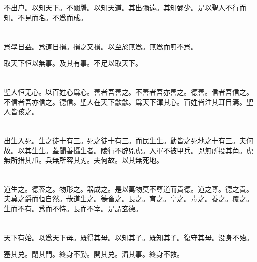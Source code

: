 \documentclass[a5paper]{ctexbook}
\newcommand{\bo}[1]{\textcolor[RGB]{0,255,255}{#1}}
\def\del{\sout}
\begin{document}
    \chapter{}

    不出户。\bo{以}知天下。不闚牖。\bo{以}知天道。其出彌遠。其知彌少。是以聖人不行而知。不見而名。不爲而成。

    \chapter{}

    爲學日益。爲道日損。損之又損。以至於無爲。無爲而無不爲。

    取天下\bo{恒}以無事。及其有事。不足以取天下。

    \chapter{}

    聖人\bo{恒无心}。以百姓心爲心。善者\bo{\del{吾}}善之。不善者\bo{\del{吾}}亦善之。德善。信者\bo{\del{吾}}信之。不信者\bo{\del{吾}}亦信之。德信。聖人在天下歙歙。爲天下渾其心。\bo{百姓皆注其耳目焉}。聖人皆孩之。

    \chapter{}

    出生入死。生之徒十有三。死之徒十有三。\bo{而民生生。動皆之死地之十有三}。夫何故。以其\bo{生生}。蓋聞善攝生者。\bo{陵}行不\bo{辟}兕虎。入軍不被甲兵。兕無所投其角。虎無所措其爪。兵無所容其刃。夫何故。以其無死地。

    \chapter{}

    道生之。德畜之。物形之。\bo{器}成之。是以萬物莫不尊道而貴德。道之尊。德之貴。夫莫之\bo{爵}而\bo{恒}自然。\bo{\del{故}}道生之。\bo{\del{德}}畜之。長之。育之。亭之。毒之。養之。覆之。生而不有。爲而不恃。長而不宰。是謂玄德。

    \chapter{}

    天下有始。以爲天下母。既得其母。以知其子。既知其子。復守其母。没身不殆。

    塞其兑。閉其門。終身不勤。開其兑。濟其事。終身不救。
\end{document}
